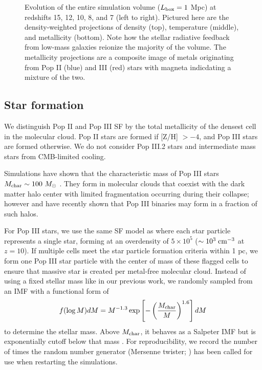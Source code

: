 \documentclass[apjl]{emulateapj}
\begin{document}

\begin{figure*}
  \caption{\label{fig:evo-mosaic} Evolution of the entire simulation
    volume ($L_{\rm box} = 1$ Mpc) at redshifts 15, 12, 10, 8, and 7
    (left to right).  Pictured here are the density-weighted
    projections of density (top), temperature (middle), and
    metallicity (bottom).  Note how the stellar radiative feedback
    from low-mass galaxies reionize the majority of the volume.  The
    metallicity projections are a composite image of metals
    originating from Pop II (blue) and III (red) stars with magneta
    indicdating a mixture of the two.}
\end{figure*}


\subsection{Star formation}

We distinguish Pop II and Pop III SF by the total metallicity of the
densest cell in the molecular cloud.  Pop II stars are formed if [Z/H]
$> -4$, and Pop III stars are formed otherwise.  We do not consider
Pop III.2 stars and intermediate mass stars from CMB-limited cooling.

Simulations have shown that the characteristic mass of Pop III stars
$M_{\rm char} \sim 100~\Ms$ \citep{ABN02, Bromm02_P3, OShea07a}.  They
form in molecular clouds that coexist with the dark matter halo center
with limited fragmentation occurring during their collapse; however
\citet{2009Sci...325..601T} and \citet{Stacy10_Binary} have recently
shown that Pop III binaries may form in a fraction of such halos.


For Pop III stars, we use the same SF model as \citet{Wise08_Gal}
where each star particle represents a single star, forming at an
overdensity of $5 \times 10^5$ ($\sim 10^3\; \cubecm$ at $z=10$).  If
multiple cells meet the star particle formation criteria within 1 pc,
we form one Pop III star particle with the center of mass of these
flagged cells to ensure that massive star is created per metal-free
molecular cloud.  Instead of using a fixed stellar mass like in our
previous work, we randomly sampled from an IMF with a functional form
of
%
\begin{equation}
\label{eqn:imf}
f(\log M) dM = M^{-1.3} \exp\left[-\left(\frac{M_{\rm
      char}}{M}\right)^{1.6}\right] dM
\end{equation}
to determine the stellar mass.  Above $M_{\rm char}$, it behaves as a
Salpeter IMF but is exponentially cutoff below that mass
\citep{Chabrier03, Clark09}.  For reproducibility, we record the number
of times the random number generator (Mersenne twister;
\citet{MTwister}) has been called for use when restarting the
simulations.
\end{document}
